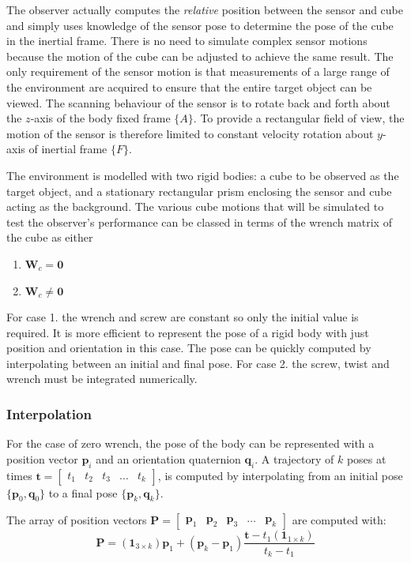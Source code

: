 The observer actually computes the \textit{relative} position between the sensor and cube and simply uses knowledge of the sensor pose to determine the pose of the cube in the inertial frame. There is no need to simulate complex sensor motions because the motion of the cube can be adjusted to achieve the same result. The only requirement of the sensor motion is that measurements of a large range of the environment are acquired to ensure that the entire target object can be viewed. The scanning behaviour of the sensor is to rotate back and forth about the $z$-axis of the body fixed frame $\{A\}$. To provide a rectangular field of view, the motion of the sensor is therefore limited to constant velocity rotation about $y$-axis of inertial frame $\{F\}$.

The environment is modelled with two rigid bodies: a cube to be observed as the target object, and a stationary rectangular prism enclosing the sensor and cube acting as the background. The various cube motions that will be simulated to test the observer's performance can be classed in terms of the wrench matrix of the cube as either
\begin{enumerate}
\item ${\textbf{W}_c} = \textbf{0}$
\item ${\textbf{W}_c} \neq \textbf{0}$
\end{enumerate}

For case 1. the wrench and screw are constant so only the initial value is required. It is more efficient to represent the pose of a rigid body with just position and orientation in this case. The pose can be quickly computed by interpolating between an initial and final pose. For case 2. the screw, twist and wrench must be integrated numerically.

\subsubsection{Interpolation}
For the case of zero wrench, the pose of the body can be represented with a position vector $\mathbf{p}_i$ and an orientation quaternion $\mathbf{q}_i$. A trajectory of $k$ poses at times 
$\mathbf{t} =
\begin{bmatrix}
	t_1 & t_2 & t_3 & \dots & t_k
\end{bmatrix}$,
is computed by interpolating from an initial pose $\{\mathbf{p}_0,\mathbf{q}_0\}$ to a final pose $\{\mathbf{p}_k,\mathbf{q}_k\}$.

The array of position vectors
$\mathbf{P}= \begin{bmatrix}
\mathbf{p}_1 & \mathbf{p}_2 & \mathbf{p}_3 & \dots & \mathbf{p}_k
\end{bmatrix}$
 are computed with:
\begin{equation}
	\mathbf{P} = 
	(\mathbf{1}_{3 \times k}){\mathbf{p}_1} + (\mathbf{p}_k - \mathbf{p}_1)\frac{\mathbf{t}-{t_1}(\mathbf{1}_{1 \times k})}{t_k - t_1}
\end{equation}

